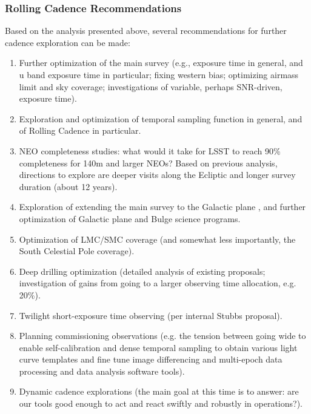 \subsubsection{Rolling Cadence Recommendations}

Based on the analysis presented above, several recommendations
for further cadence exploration can be made:

\begin{enumerate}

\item Further optimization of the main survey (e.g., exposure time in
general, and u band exposure time in particular; fixing western bias;
optimizing airmass limit and sky coverage; investigations of variable,
perhaps SNR-driven, exposure time).

\item Exploration and optimization of temporal sampling function in
general, and of Rolling Cadence in particular.

\item NEO completeness studies: what would it take for LSST to reach
90\% completeness for 140m and larger NEOs?  Based on previous
analysis, directions to explore are deeper visits along the Ecliptic
and longer survey duration (about 12 years).

\item Exploration of extending the main survey to the Galactic plane
\citep{Gould2013}, and further optimization of
Galactic plane and Bulge science programs.

\item Optimization of LMC/SMC coverage (and somewhat less importantly,
the South Celestial Pole coverage).

\item Deep drilling optimization (detailed analysis of existing
proposals; investigation of gains from going to a larger observing
time allocation, e.g. 20\%).

\item Twilight short-exposure time observing (per internal Stubbs proposal).

\item Planning commissioning observations (e.g. the tension between
going wide to enable self-calibration and dense temporal sampling to
obtain various light curve templates and fine tune image differencing
and multi-epoch data processing and data analysis software tools).

\item Dynamic cadence explorations (the main goal at this time is to
answer: are our tools good enough to act and react swiftly and
robustly in operations?).

\end{enumerate}



\navigationbar
